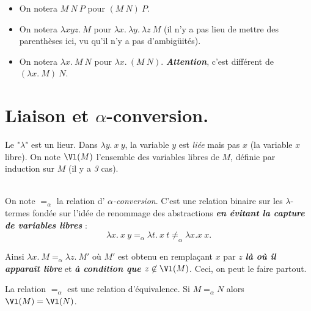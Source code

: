 \documentclass{../notes}
\begin{document}
  \begin{nota}
    \begin{itemize}
      \item On notera $M \: N \: P$ pour  $(M \: N) \: P$.
      \item On notera  $\lambda x y z. \: M$ pour  $\lambda x. \: \lambda y. \: \lambda z \: M$ (il n'y a pas lieu de mettre des parenthèses ici, vu qu'il n'y a pas d'ambigüités).
      \item On notera  $\lambda x. \: M \: N$ pour  $\lambda x. \: (M \: N)$.  \textit{\textbf{Attention}}, c'est différent de $(\lambda x.\: M) \: N$.
    \end{itemize}
  \end{nota}

  \section{Liaison et $\alpha$-conversion.}

  \begin{rmk}[Liaison]
    Le "$\lambda$" est un lieur.
    Dans $\lambda y. \: x \: y$, la variable  $y$ est \textit{liée} mais pas $x$ (la variable $x$ libre).
    On note $\Vl(M)$ l'ensemble des variables libres de  $M$, définie par induction sur $M$ (il y a \textit{3} cas).
  \end{rmk}

  \begin{rmk}
    ~\\[-1.5\baselineskip]

    On note $=_\alpha$ la relation d' \textit{$\alpha$-conversion}. C'est une relation binaire sur les $\lambda$-termes fondée sur l'idée de renommage des abstractions \textcolor{nicered}{\textit{\textbf{en évitant la capture de variables libres}}} :
    \[
    \lambda x. \: x \: y =_\alpha \lambda t.\: x \: t \neq_\alpha \lambda x. x \: x
    .\]

    Ainsi $\lambda x. \: M =_\alpha \lambda z.\: M'$ où  $M'$ est obtenu en remplaçant $x$ par $z$ \textcolor{nicered}{\textit{\textbf{là où il apparaît libre}}} et \textcolor{nicered}{\textit{\textbf{à condition que $z \not\in  \Vl(M)$}}}.
    Ceci, on peut le faire partout.
  \end{rmk}

  \begin{lem}
    La relation $=_\alpha$ est une relation d'équivalence.
    Si  $M =_\alpha N$ alors  $\Vl(M) = \Vl(N)$.
  \end{lem}
\end{document}
